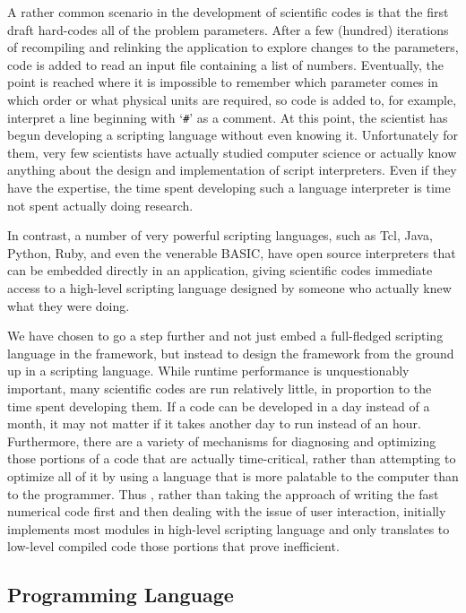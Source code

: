 A rather common scenario in the development of scientific codes is
that the first draft hard-codes all of the problem parameters.  After
a few (hundred) iterations of recompiling and relinking the
application to explore changes to the parameters, code is added to
read an input file containing a list of numbers.  Eventually, the
point is reached where it is impossible to remember which parameter
comes in which order or what physical units are required, so code is
added to, for example, interpret a line beginning with `\verb|#|' as a
comment.  At this point, the scientist has begun developing a
scripting language without even knowing it.  Unfortunately for them,
very few scientists have actually studied computer science or actually
know anything about the design and implementation of script
interpreters.  Even if they have the expertise, the time spent
developing such a language interpreter is time not spent actually
doing research.

In contrast, a number of very powerful scripting languages, such as
Tcl, Java, Python, Ruby, and even the venerable BASIC, have open
source interpreters that can be embedded directly in an application,
giving scientific codes immediate access to a high-level scripting
language designed by someone who actually knew what they were doing.

We have chosen to go a step further and not just embed a full-fledged
scripting language in the \FiPy{} framework, but instead to design the
framework from the ground up in a scripting language.  While runtime
performance is unquestionably important, many scientific codes are run
relatively little, in proportion to the time spent developing them.
If a code can be developed in a day instead of a month, it may not
matter if it takes another day to run instead of an hour.
Furthermore, there are a variety of mechanisms for diagnosing and
optimizing those portions of a code that are actually time-critical,
rather than attempting to optimize all of it by using a language that
is more palatable to the computer than to the programmer.  Thus
\FiPy{}, rather than taking the approach of writing the fast numerical
code first and then dealing with the issue of user interaction,
initially implements most modules in high-level scripting language and
only translates to low-level compiled code those portions that prove
inefficient.

\subsection{\Python{} Programming Language}

